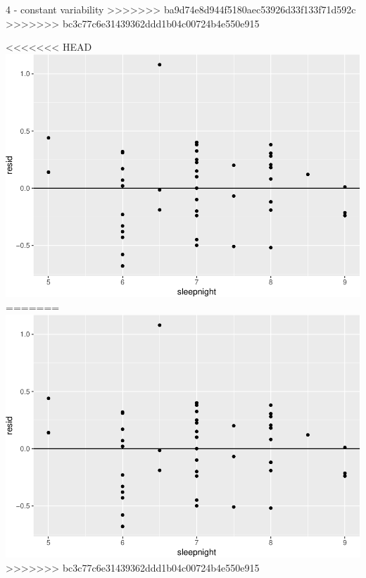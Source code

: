 \documentclass[]{article}
\newenvironment{Shaded}{\begin{snugshade}}{\end{snugshade}}
\newcommand{\DataTypeTok}[1]{\textcolor[rgb]{0.13,0.29,0.53}{#1}}
\newcommand{\DecValTok}[1]{\textcolor[rgb]{0.00,0.00,0.81}{#1}}
\newcommand{\KeywordTok}[1]{\textcolor[rgb]{0.13,0.29,0.53}{\textbf{#1}}}
\newcommand{\NormalTok}[1]{#1}
\newcommand{\OperatorTok}[1]{\textcolor[rgb]{0.81,0.36,0.00}{\textbf{#1}}}
\newcommand{\StringTok}[1]{\textcolor[rgb]{0.31,0.60,0.02}{#1}}
\begin{document}
4 - constant variability
\textgreater{}\textgreater{}\textgreater{}\textgreater{}\textgreater{}\textgreater{}\textgreater{}
ba9d74e8d944f5180aec53926d33f133f71d592c
>>>>>>> bc3c77c6e31439362ddd1b04c00724b4e550e915

\begin{Shaded}
\end{Shaded}

<<<<<<< HEAD
\includegraphics{lab-8-regression_files/figure-latex/unnamed-chunk-10-1.pdf}
=======
\includegraphics{lab-8-regression_files/figure-latex/unnamed-chunk-11-1.pdf}
>>>>>>> bc3c77c6e31439362ddd1b04c00724b4e550e915
\end{document}
